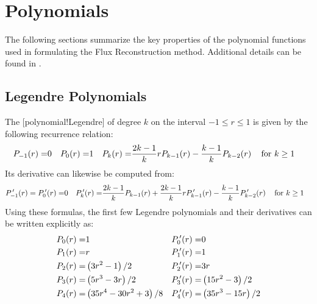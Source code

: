 \clearpage
\appendix


\section{Polynomials}


The following sections summarize the key properties of the
polynomial functions used in formulating the Flux Reconstruction
method.
%
Additional details can be found in .


\subsection{Legendre Polynomials}
\label{SEC:LegendrePoly}


The [polynomial!Legendre]
of degree $k$ on the interval $-1\leq r\leq1$ is given
by the following recurrence relation\cite{Szego_1967,Hildebrand_1974}:
%
\begin{align}
    \Leg{-1}\pvp[r] =& 0 &
    \Leg{ 0}\pvp[r] =& 1 &
    \Leg{ k}\pvp[r] =& \frac{2k-1}{k} r \Leg{k-1}\pvp[r]
                    -  \frac{ k-1}{k}   \Leg{k-2}\pvp[r]
    \quad\text{for $k \geq 1$}
\end{align}
%
Its derivative can likewise be computed from:
\begin{align}
    \dLeg{-1}\pvp[r] =  
    \dLeg{ 0}\pvp[r] =& 0 &
    \dLeg{ k}\pvp[r] =& \frac{2k-1}{k}    \Leg{k-1}\pvp[r]
                      + \frac{2k-1}{k} r \dLeg{k-1}\pvp[r]
                      - \frac{ k-1}{k}   \dLeg{k-2}\pvp[r]
    \quad\text{for $k \geq 1$}
\end{align}
%
Using these formulas, the first few Legendre polynomials and their
derivatives can be written explicitly as:
\begin{align}
     \Leg{0}\pvp[r] =& 1 &
    \dLeg{0}\pvp[r] =& 0 \\
     \Leg{1}\pvp[r] =& r &
    \dLeg{1}\pvp[r] =& 1 \\
     \Leg{2}\pvp[r] =& \left(  3 r^2 -  1         \right) / 2 &
    \dLeg{2}\pvp[r] =& 3 r \\
     \Leg{3}\pvp[r] =& \left(  5 r^3 -  3 r       \right) / 2 &
    \dLeg{3}\pvp[r] =& \left( 15 r^2 -  3         \right) / 2 \\
     \Leg{4}\pvp[r] =& \left( 35 r^4 - 30 r^2 + 3 \right) / 8 &
    \dLeg{4}\pvp[r] =& \left( 35 r^3 - 15 r       \right) / 2
\end{align}
 
